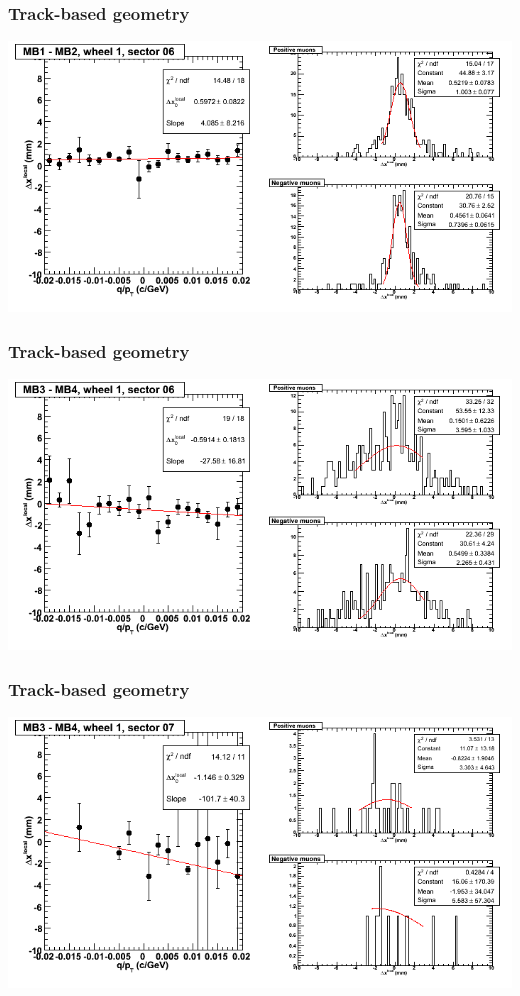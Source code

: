 \documentclass[compress]{beamer}
\begin{document}
\begin{frame}
\frametitle{Track-based geometry}
\includegraphics[width=\linewidth]{NOV4_segdiffs/dt13_resid_D_06_12.png}
\end{frame}

\begin{frame}
\frametitle{Track-based geometry}
\includegraphics[width=\linewidth]{NOV4_segdiffs/dt13_resid_D_06_34.png}
\end{frame}

\begin{frame}
\frametitle{Track-based geometry}
\includegraphics[width=\linewidth]{NOV4_segdiffs/dt13_resid_D_07_34.png}
\end{frame}
\end{document}
